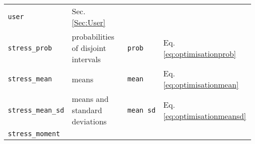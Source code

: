 \documentclass[
]{article}
\begin{document}
\begin{longtable}[]{@{}llll@{}}
\begin{minipage}[t]{0.09\columnwidth}
\texttt{user}\strut
\end{minipage} & \begin{minipage}[t]{0.20\columnwidth}\raggedright
Sec. \ref{Sec:User}\strut
\end{minipage}\tabularnewline
\begin{minipage}[t]{0.20\columnwidth}\raggedright
\texttt{stress\_prob}\strut
\end{minipage} & \begin{minipage}[t]{0.39\columnwidth}\raggedright
probabilities of disjoint intervals\strut
\end{minipage} & \begin{minipage}[t]{0.09\columnwidth}\raggedright
\texttt{prob}\strut
\end{minipage} & \begin{minipage}[t]{0.20\columnwidth}\raggedright
Eq. \eqref{eq:optimisationprob}\strut
\end{minipage}\tabularnewline
\begin{minipage}[t]{0.20\columnwidth}\raggedright
\texttt{stress\_mean}\strut
\end{minipage} & \begin{minipage}[t]{0.39\columnwidth}\raggedright
means\strut
\end{minipage} & \begin{minipage}[t]{0.09\columnwidth}\raggedright
\texttt{mean}\strut
\end{minipage} & \begin{minipage}[t]{0.20\columnwidth}\raggedright
Eq. \eqref{eq:optimisationmean}\strut
\end{minipage}\tabularnewline
\begin{minipage}[t]{0.20\columnwidth}\raggedright
\texttt{stress\_mean\_sd}\strut
\end{minipage} & \begin{minipage}[t]{0.39\columnwidth}\raggedright
means and standard deviations\strut
\end{minipage} & \begin{minipage}[t]{0.09\columnwidth}\raggedright
\texttt{mean\ sd}\strut
\end{minipage} & \begin{minipage}[t]{0.20\columnwidth}\raggedright
Eq. \eqref{eq:optimisationmeansd}\strut
\end{minipage}\tabularnewline
\begin{minipage}[t]{0.20\columnwidth}\raggedright
\texttt{stress\_moment}\strut
\end{minipage} & \begin{minipage}[t]{0.39\columnwidth}\raggedright

\end{minipage}
\end{longtable}
\end{document}
